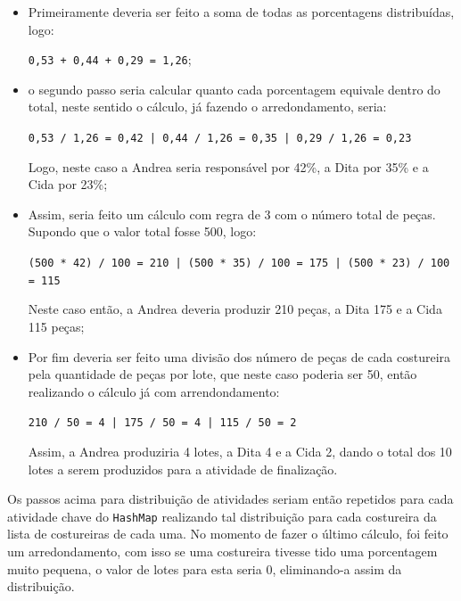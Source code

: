 \begin{itemize}
	\item Primeiramente deveria ser feito a soma de todas as porcentagens distribuídas, logo: 
	\par \texttt{0,53 + 0,44 + 0,29 = 1,26};
	
	\item o segundo passo seria calcular quanto cada porcentagem equivale dentro do total, neste 
	sentido o cálculo, já fazendo o arredondamento, seria: 
	\par \texttt{0,53 / 1,26 = 0,42 | 0,44 / 1,26 = 0,35 | 0,29 / 1,26 = 0,23}
	\par Logo, neste caso a Andrea seria responsável por 42\%, a Dita por 35\% e a Cida por 23\%;
	
	\item Assim, seria feito um cálculo com regra de 3 com o número total de peças. Supondo que o 
	 valor total fosse 500, logo:
	
	\par \texttt{(500 * 42) / 100 = 210 | (500 * 35) / 100 = 175 | (500 * 23) / 100 = 115}
	
	\par Neste caso então, a Andrea deveria produzir 210 peças, a Dita 175 e a Cida 115 peças;
	
	\item Por fim deveria ser feito uma divisão dos número de peças de cada costureira pela quantidade
     de peças por lote, que neste caso poderia ser 50, então realizando o cálculo já com arrendondamento:
     \par \texttt{210 / 50 = 4 | 175 / 50 = 4 | 115 / 50 = 2}
     
     \par Assim, a Andrea produziria 4 lotes, a Dita 4 e a Cida 2, dando o total
     dos 10 lotes a serem produzidos para a atividade de finalização.
	
\end{itemize}
 
 \par Os passos acima para distribuição de atividades seriam então repetidos
 para cada atividade chave do \texttt{HashMap} realizando tal distribuição para cada costureira da lista de 
 costureiras de cada uma. No momento de fazer o último cálculo, foi feito um arredondamento, com isso se uma 
 costureira tivesse tido uma porcentagem muito pequena, o valor de lotes para
 esta seria 0, eliminando-a assim da distribuição.
 
